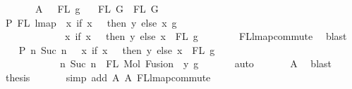 \begin{isabellebody}
\ \ \ \ \ \ \ A{}{\isacharcolon}{\kern0pt}\ {\isachardoublequoteopen}{}\ {\isasymin}\ FL\ g{\isachardoublequoteclose}\isanewline
\ \ \ {\isachardoublequoteopen}FL\ G{}\ {\isacharequal}{\kern0pt}\ FL\ G{}{\isachardoublequoteclose}\isanewline
%
\isadelimproof
%
\endisadelimproof
%
\isatagproof
{}\isamarkupfalse%
\ {\isacharminus}{\kern0pt}\isanewline
\ \ \isamarkupfalse%
\ P{}{\isacharcolon}{\kern0pt}\ {\isachardoublequoteopen}FL\ {\isacharparenleft}{\kern0pt}lmap\ {\isacharparenleft}{\kern0pt}{\isasymlambda}\ x{\isachardot}{\kern0pt}\ if\ x\ {\isacharequal}{\kern0pt}\ {}\ then\ y\ else\ x{\isacharparenright}{\kern0pt}\ g{\isacharparenright}{\kern0pt}\ {\isacharequal}{\kern0pt}\isanewline
\ \ \ \ \ \ \ \ \ \ \ \ {\isacharparenleft}{\kern0pt}{\isasymlambda}\ x{\isachardot}{\kern0pt}\ if\ x\ {\isacharequal}{\kern0pt}\ {}\ then\ y\ else\ x{\isacharparenright}{\kern0pt}\ {\isacharbackquote}{\kern0pt}\ FL\ g{\isachardoublequoteclose}\isanewline
\ \ \ \ \ \ \isamarkupfalse%
\ FL{\isacharunderscore}{\kern0pt}lmap{\isacharunderscore}{\kern0pt}commute\ \isamarkupfalse%
\ blast\isanewline
\ \ \isamarkupfalse%
\ P{}{\isacharcolon}{\kern0pt}\ {\isachardoublequoteopen}{\isacharbraceleft}{\kern0pt}n{\isachardot}{\kern0pt}\ Suc\ n\ {\isasymin}\ {\isacharparenleft}{\kern0pt}{\isasymlambda}\ x{\isachardot}{\kern0pt}\ if\ x\ {\isacharequal}{\kern0pt}\ {}\ then\ y\ else\ x{\isacharparenright}{\kern0pt}\ {\isacharbackquote}{\kern0pt}\ FL\ g{\isacharbraceright}{\kern0pt}\ {\isacharequal}{\kern0pt}\isanewline
\ \ \ \ \ \ \ \ \ \ \ \ {\isacharbraceleft}{\kern0pt}n{\isachardot}{\kern0pt}\ Suc\ n\ {\isasymin}\ FL\ {\isacharparenleft}{\kern0pt}Mol\ {\isacharparenleft}{\kern0pt}Fusion\ {}\ y{\isacharparenright}{\kern0pt}\ g{\isacharparenright}{\kern0pt}{\isacharbraceright}{\kern0pt}{\isachardoublequoteclose}\isanewline
\ \ \ \ \ \isamarkupfalse%
\ auto\isanewline
\ \ \ \ \ \isamarkupfalse%
\ A{}\ \isamarkupfalse%
\ blast\isanewline
\ \ \isamarkupfalse%
\ \isamarkupfalse%
\ {\isacharquery}{\kern0pt}thesis\isanewline
\ \ \ \ \ \isamarkupfalse%
\ {\isacharparenleft}{\kern0pt}simp\ add{\isacharcolon}{\kern0pt}\ A{}\ A{}\ FL{\isacharunderscore}{\kern0pt}lmap{\isacharunderscore}{\kern0pt}commute{\isacharparenright}{\kern0pt}\isanewline

\end{isabellebody}
